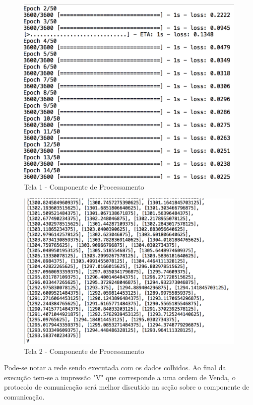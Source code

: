 \begin{figure}[h]
	\centering
	\includegraphics[keepaspectratio=true,scale=0.8]{figuras/tela1.png}
	\caption{Tela 1 - Componente de Processamento}
	\label{fig12}
\end{figure}

\pagebreak

\begin{figure}[h]
	\centering
	\includegraphics[keepaspectratio=true,scale=0.8]{figuras/tela2.png}
	\caption{Tela 2 - Componente de Processamento}
	\label{fig12}
\end{figure}

Pode-se notar a rede sendo executada com os dados colhidos. Ao final da execução tem-se a impressão "V" que corresponde a uma ordem de Venda, o protocolo de comunicação será melhor discutido na seção sobre o componente de comunicação.

